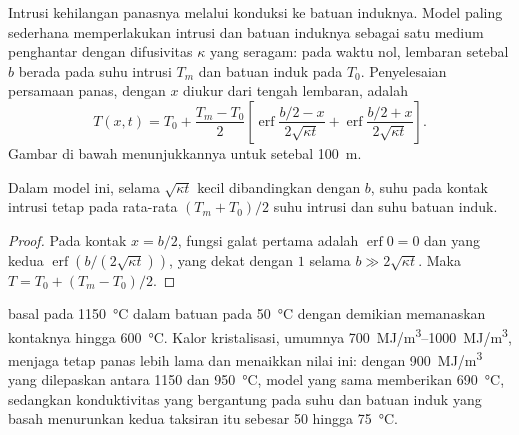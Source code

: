Intrusi kehilangan panasnya melalui konduksi ke batuan induknya. Model paling sederhana
memperlakukan intrusi dan batuan induknya sebagai satu medium penghantar dengan
difusivitas $\kappa$ yang seragam: pada waktu nol, lembaran setebal $b$ berada pada suhu
intrusi $T_m$ dan batuan induk pada $T_0$. Penyelesaian persamaan panas, dengan
$x$ diukur dari tengah lembaran, adalah
\[
T(x,t) = T_0 + \frac{T_m - T_0}{2}\left[\operatorname{erf}\frac{b/2 - x}{2\sqrt{\kappa t}}
+ \operatorname{erf}\frac{b/2 + x}{2\sqrt{\kappa t}}\right].
\]
Gambar di bawah menunjukkannya untuk  setebal \qty{100}{m}.

\begin{proposition}\label{prop:b2:magma-emplacement:contact}
Dalam model ini, selama $\sqrt{\kappa t}$ kecil dibandingkan dengan $b$,
suhu pada kontak intrusi tetap pada rata-rata $(T_m + T_0)/2$
suhu intrusi dan suhu batuan induk.
\end{proposition}

\begin{proof}
Pada kontak $x = b/2$, fungsi galat pertama adalah $\operatorname{erf}0 = 0$ dan
yang kedua $\operatorname{erf}(b/(2\sqrt{\kappa t}))$, yang dekat dengan $1$ selama
$b \gg 2\sqrt{\kappa t}$. Maka $T = T_0 + (T_m - T_0)/2$.
\end{proof}

 basal pada \qty{1150}{\celsius} dalam batuan pada \qty{50}{\celsius} dengan demikian memanaskan
kontaknya hingga \qty{600}{\celsius}. Kalor kristalisasi, umumnya
\qtyrange{700}{1000}{MJ/m^3}, menjaga  tetap panas lebih lama dan menaikkan nilai ini:
dengan \qty{900}{MJ/m^3} yang dilepaskan antara \num{1150} dan \qty{950}{\celsius}, model yang sama
memberikan \qty{690}{\celsius}, sedangkan konduktivitas yang bergantung pada suhu dan batuan induk
yang basah menurunkan kedua taksiran itu sebesar 50 hingga \qty{75}{\celsius}.

